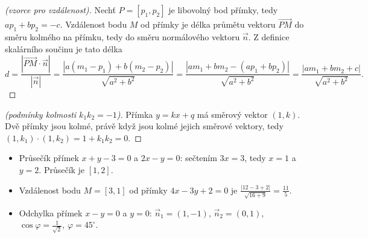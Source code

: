 \begin{center}
\end{center}

\begin{proof}[(vzorce pro vzdálenost)]
  Nechť $P = [p_1, p_2]$ je libovolný bod přímky, tedy $ap_1 + bp_2 = -c$. Vzdálenost bodu $M$ od přímky je délka průmětu vektoru $\overrightarrow{PM}$ do směru kolmého na přímku, tedy do směru normálového vektoru $\vec{n}$. Z definice skalárního součinu je tato délka
  \begin{equation*}
    d = \frac{|\overrightarrow{PM}\cdot\vec{n}|}{|\vec{n}|} = \frac{|a(m_1 - p_1) + b(m_2 - p_2)|}{\sqrt{a^2 + b^2}} = \frac{|am_1 + bm_2 - (ap_1 + bp_2)|}{\sqrt{a^2 + b^2}} = \frac{|am_1 + bm_2 + c|}{\sqrt{a^2 + b^2}}.
  \end{equation*}
\end{proof}

\begin{proof}[(podmínky kolmosti $k_1k_2 = -1$)]
  Přímka $y = kx + q$ má směrový vektor $(1, k)$. Dvě přímky jsou kolmé, právě když jsou kolmé jejich směrové vektory, tedy $(1, k_1)\cdot(1, k_2) = 1 + k_1k_2 = 0$.
\end{proof}

\begin{example}\label{ex:primka-vzdalenost}
  \begin{itemize}
    \item Průsečík přímek $x + y - 3 = 0$ a $2x - y = 0$: sečtením $3x = 3$, tedy $x = 1$ a $y = 2$. Průsečík je $[1, 2]$.
    \item Vzdálenost bodu $M = [3, 1]$ od přímky $4x - 3y + 2 = 0$ je $\frac{|12 - 3 + 2|}{\sqrt{16 + 9}} = \frac{11}{5}$.
    \item Odchylka přímek $x - y = 0$ a $y = 0$: $\vec{n}_1 = (1, -1)$, $\vec{n}_2 = (0, 1)$, $\cos\varphi = \frac{1}{\sqrt{2}}$, $\varphi = 45^\circ$.
  \end{itemize}
\end{example}

